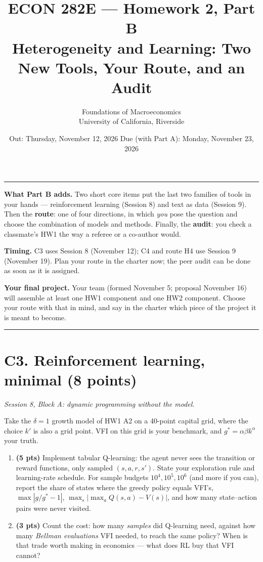 \documentclass[11pt]{article}
\title{\vspace{-2em}\textbf{ECON 282E --- Homework 2, Part B}\\[2mm]
       \large Heterogeneity and Learning: Two New Tools, Your Route, and an Audit}
\author{Foundations of Macroeconomics \\ University of California, Riverside}
\date{Out: Thursday, November 12, 2026 \quad\textbullet\quad Due (with Part A): Monday, November 23, 2026}
\begin{document}
\maketitle
\thispagestyle{empty}

\noindent\rule{\linewidth}{0.4pt}\par
\small
\textbf{What Part B adds.} Two short core items put the last two families of tools in your hands ---
reinforcement learning (Session 8) and text as data (Session 9). Then the \textbf{route}: one of four
directions, in which \emph{you} pose the question and choose the combination of models and methods.
Finally, the \textbf{audit}: you check a classmate's HW1 the way a referee or a co-author would.

\textbf{Timing.} C3 uses Session 8 (November 12); C4 and route H4 use Session 9 (November 19). Plan
your route in the charter now; the peer audit can be done as soon as it is assigned.

\textbf{Your final project.} Your team (formed November 5; proposal November 16) will assemble at
least one HW1 component and one HW2 component. Choose your route with that in mind, and say in the
charter which piece of the project it is meant to become.
\normalsize\par
\noindent\rule{\linewidth}{0.4pt}\par

\section*{C3. Reinforcement learning, minimal (8 points)}
\emph{Session 8, Block A: dynamic programming without the model.}

Take the $\delta=1$ growth model of HW1 A2 on a 40-point capital grid, where the choice $k'$ is also a
grid point. VFI on this grid is your benchmark, and $g^*=\alpha\beta k^\alpha$ your truth.
\begin{enumerate}[label=(\alph*), leftmargin=*]
  \item \textbf{(5 pts)} Implement tabular Q-learning: the agent never sees the transition or reward
        functions, only sampled $(s,a,r,s')$. State your exploration rule and learning-rate schedule.
        For sample budgets $10^4,10^5,10^6$ (and more if you can), report the share of states where
        the greedy policy equals VFI's, $\max|g/g^*-1|$, $\max_s|\max_aQ(s,a)-V(s)|$, and how many
        state--action pairs were never visited.
  \item \textbf{(3 pts)} Count the cost: how many \emph{samples} did Q-learning need, against how many
        \emph{Bellman evaluations} VFI needed, to reach the same policy? When is that trade worth
        making in economics --- what does RL buy that VFI cannot?
\end{enumerate}
\end{document}
